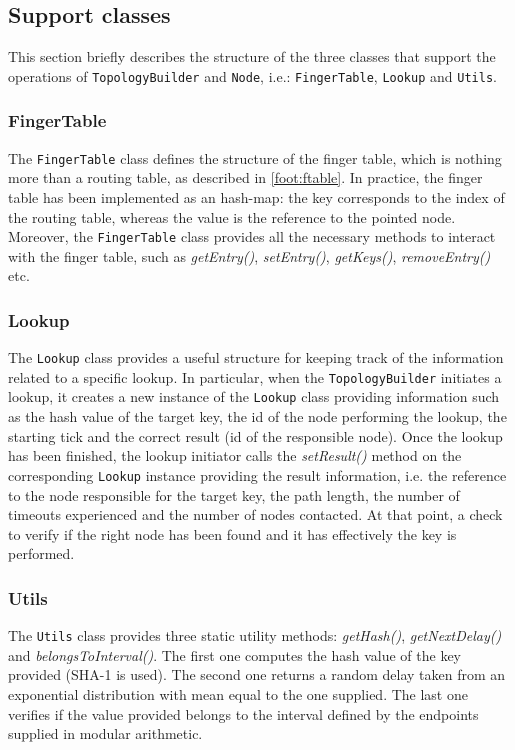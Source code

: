 \documentclass[11pt,twocolumn,letterpaper]{article}
\begin{document}
	\subsection{Support classes}
	\label{subsec:support-classes}
	This section briefly describes the structure of the three classes that support the operations of \texttt{TopologyBuilder} and \texttt{Node}, i.e.: \texttt{FingerTable}, \texttt{Lookup} and \texttt{Utils}.
	
	\subsubsection{FingerTable}
	\label{subsubsec:finger-table}
	The \texttt{FingerTable} class defines the structure of the finger table, which is nothing more than a routing table, as described in \cref{foot:ftable}. In practice, the finger table has been implemented as an hash-map: the key corresponds to the index of the routing table, whereas the value is the reference to the pointed node. Moreover, the \texttt{FingerTable} class provides all the necessary methods to interact with the finger table, such as \textit{getEntry()}, \textit{setEntry()}, \textit{getKeys()}, \textit{removeEntry()} etc.
	
	\subsubsection{Lookup}
	\label{subsubsec:lookup-class}
	The \texttt{Lookup} class provides a useful structure for keeping track of the information related to a specific lookup. \newline
	In particular, when the \texttt{TopologyBuilder} initiates a lookup, it creates a new instance of the \texttt{Lookup} class providing information such as the hash value of the target key, the id of the node performing the lookup, the starting tick and the correct result (id of the responsible node). \newline
	Once the lookup has been finished, the lookup initiator calls the \textit{setResult()} method on the corresponding \texttt{Lookup} instance providing the result information, i.e. the reference to the node responsible for the target key, the path length, the number of timeouts experienced and the number of nodes contacted. At that point, a check to verify if the right node has been found and it has effectively the key is performed.
	
	\subsubsection{Utils}
	\label{subsubsec:utils}
	The \texttt{Utils} class provides three static utility methods: \textit{getHash()}, \textit{getNextDelay()} and \textit{belongsToInterval()}. \newline
	The first one computes the hash value of the key provided (SHA-1 is used). The second one returns a random delay taken from an exponential distribution with mean equal to the one supplied. The last one verifies if the value provided belongs to the interval defined by the endpoints supplied in modular arithmetic.
	
\end{document}
